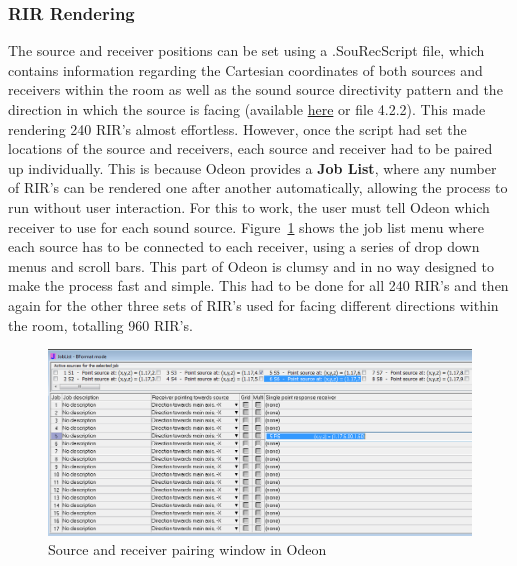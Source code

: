 \documentclass[../../main.tex]{subfiles}
\begin{document}
		\subsubsection{RIR Rendering}
			\label{odeon:rendering}

			The source and receiver positions can be set using a .SouRecScript file, which contains information regarding the Cartesian coordinates of both sources and receivers within the room as well as the sound source directivity pattern and the direction in which the source is facing (available \href{file:///Users/Lewis%201/Uni%20Work/4th%20Year/Project/Write%20Up/Web%20Page/lt669.github.io/pages/Bulk_0.SouRecScript}{here} or file 4.2.2). This made rendering 240 \ac{RIR}'s almost effortless. However, once the script had set the locations of the source and receivers, each source and receiver had to be paired up individually. This is because Odeon provides a \textbf{Job List}, where any number of \ac{RIR}'s can be rendered one after another automatically, allowing the process to run without user interaction. For this to work, the user must tell Odeon which receiver to use for each sound source. Figure~\ref{SouRecPos} shows the job list menu where each source has to be connected to each receiver, using a series of drop down menus and scroll bars. This part of Odeon is clumsy and in no way designed to make the process fast and simple. This had to be done for all 240 \ac{RIR}'s and then again for the other three sets of \ac{RIR}'s used for facing different directions within the room, totalling 960 \ac{RIR}'s.

			\begin{figure}[H]
				\centerline{\includegraphics[scale = 0.54]{Sections/Implementation/Odeon/images/SouRecPos/SouRecSelection_crop.png}}
				\caption{Source and receiver pairing window in Odeon}
				\label{SouRecPos}
			\end{figure}
\end{document}
